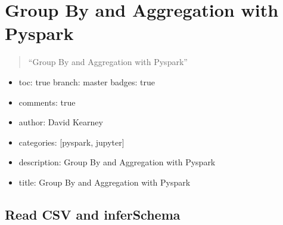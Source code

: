 \documentclass[letterpaper,10pt,english]{sphinxmanual}
\begin{document}
\section{Group By and Aggregation with Pyspark}
\label{\detokenize{2020-08-17-Pyspark-Group-By:group-by-and-aggregation-with-pyspark}}\label{\detokenize{2020-08-17-Pyspark-Group-By::doc}}\begin{quote}

“Group By and Aggregation with Pyspark”
\end{quote}
\begin{itemize}
\item {} 
toc: true\sphinxhyphen{} branch: master\sphinxhyphen{} badges: true

\item {} 
comments: true

\item {} 
author: David Kearney

\item {} 
categories: {[}pyspark, jupyter{]}

\item {} 
description: Group By and Aggregation with Pyspark

\item {} 
title: Group By and Aggregation with Pyspark

\end{itemize}


\subsection{Read CSV and inferSchema}
\label{\detokenize{2020-08-17-Pyspark-Group-By:read-csv-and-inferschema}}
\begin{sphinxVerbatim}[commandchars=\\\{\}]
   
    


  
    
\end{sphinxVerbatim}
\end{document}
